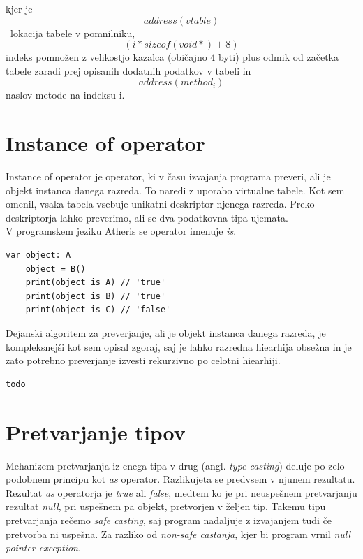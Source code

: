 \documentclass[a4paper, 12pt]{book}
\begin{document}
kjer je \[address(vtable)\]\ lokacija tabele v pomnilniku, \[(i * sizeof(void*) + 8)\] indeks pomnožen z velikostjo kazalca (običajno 4 byti) plus odmik od začetka tabele zaradi prej opisanih dodatnih podatkov v tabeli in \[ address(method_i)\] naslov metode na indeksu i.
\newpage

\section{Instance of operator}

Instance of operator je operator, ki v času izvajanja programa preveri, ali je objekt instanca danega razreda. To naredi z uporabo virtualne tabele. Kot sem omenil, vsaka tabela vsebuje unikatni deskriptor njenega razreda. Preko deskriptorja lahko preverimo, ali se dva podatkovna tipa ujemata. \\
\indent V programskem jeziku Atheris se operator imenuje \textit{is}.

\begin{lstlisting}[caption={Uporaba operatorja \textit{is} za razrede iz sheme ~\ref{vtables}}, captionpos=b]
	var object: A
	object = B()
	print(object is A) // 'true'
	print(object is B) // 'true'
	print(object is C) // 'false'
\end{lstlisting}

Dejanski algoritem za preverjanje, ali je objekt instanca danega razreda, je  kompleksnejši kot sem opisal zgoraj, saj je lahko razredna hiearhija obsežna in je zato potrebno preverjanje izvesti rekurzivno po celotni hiearhiji.

\begin{lstlisting}[caption={Algoritem za izračun ali je objekt instanca danega razeda}, captionpos=b]
todo
\end{lstlisting}

\newpage

\section{Pretvarjanje tipov}

Mehanizem pretvarjanja iz enega tipa v drug (angl. \textit{type casting}) deluje po zelo podobnem principu kot \textit{as} operator. Razlikujeta se predvsem v njunem rezultatu. Rezultat \textit{as} operatorja je \textit{true} ali \textit{false}, medtem ko je pri neuspešnem pretvarjanju rezultat \textit{null}, pri uspešnem pa objekt, pretvorjen v željen tip. Takemu tipu pretvarjanja rečemo \textit{safe casting}, saj program nadaljuje z izvajanjem tudi če pretvorba ni uspešna. Za razliko od \textit{non-safe castanja}, kjer bi program vrnil \textit{null pointer exception}.
\end{document}
